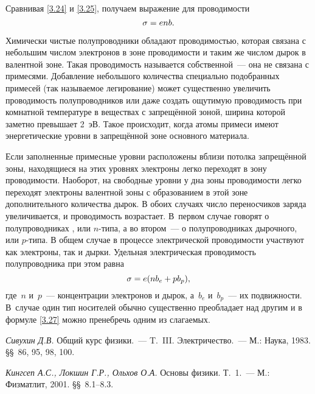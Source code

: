 Сравнивая \eqref{3.24} и \eqref{3.25}, получаем выражение для проводимости
\begin{equation}
	\eqmark{3.26}
	\sigma=enb.
\end{equation}

Химически чистые полупроводники обладают проводимостью, которая связана с
небольшим числом электронов в зоне
проводимости и таким же числом дырок в валентной зоне. Такая проводимость
называется собственной~--- она не связана с примесями. Добавление небольшого
количества специально подобранных примесей (так называемое
легирование) может существенно увеличить проводимость полупроводников или даже
создать ощутимую проводимость при комнатной температуре в веществах с
запрещённой зоной, ширина которой заметно превышает 2~эВ. Такое происходит,
когда атомы примеси имеют энергетические уровни в запрещённой зоне основного
материала.

Если заполненные примесные уровни расположены вблизи потолка запрещённой зоны,
находящиеся на этих уровнях электроны легко переходят в зону проводимости.
Наоборот, на свободные уровни у дна зоны проводимости легко переходят электроны
валентной зоны с образованием в этой зоне дополнительного количества дырок. В
обоих случаях число переносчиков заряда увеличивается, и проводимость
возрастает. В~первом случае говорят о полупроводниках ,
или $n$-типа, а во втором~--- о  полупроводниках дырочного, или $p$-типа. В
общем случае в процессе электрической проводимости участвуют как электроны, так
и дырки. Удельная электрическая проводимость полупроводника при этом равна
\begin{equation}
	\eqmark{3.27}
	\sigma=e(nb_e+pb_p),
\end{equation}
где~$n$ и~$p$~--- концентрации электронов и дырок, а~$b_e$ и~$b_p$~--- их
подвижности. В~случае  один тип носителей обычно существенно преобладает над другим и в
формуле \eqref{3.27} можно пренебречь одним из слагаемых.



\begin{lab:literature}
	\item{ \emph{Сивухин Д.В.} Общий курс физики.~--- T.~III. Электричество.~---
М.: Наука, 1983. \S\S~86, 95, 98, 100.}
	\item{ \emph{Кингсеп А.С., Локшин Г.Р., Ольхов О.А.} Основы физики.
Т.~1.~--- М.: Физматлит, 2001. \S\S~8.1--8.3.}
\end{lab:literature}


